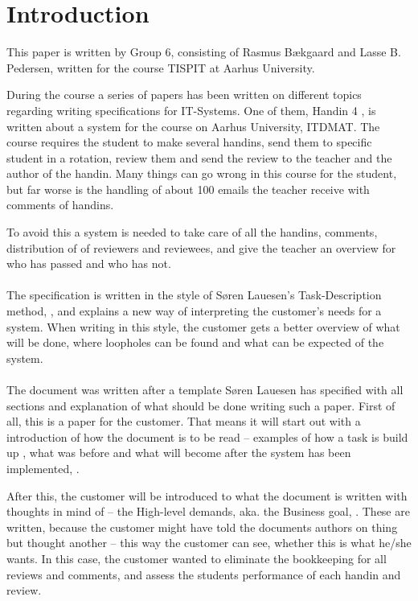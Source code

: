 \documentclass[Main]{subfiles}
\begin{document}
\section{Introduction}


This paper is written by Group 6, consisting of Rasmus Bækgaard and Lasse B. Pedersen, written for the course TISPIT at Aarhus University.


During the course a series of papers has been written on different topics regarding writing specifications for IT-Systems.
One of them, Handin 4 \parencite{HI4}, is written about a system for the course on Aarhus University, ITDMAT. 
The course requires the student to make several handins, send them to specific student in a rotation, review them and send the review to the teacher and the author of the handin.
Many things can go wrong in this course for the student, but far worse is the handling of about 100 emails the teacher receive with comments of handins.

To avoid this a system is needed to take care of all the handins, comments, distribution of of reviewers and reviewees, and give the teacher an overview for who has passed and who has not.
\\
\\
The specification is written in the style of Søren Lauesen's Task-Description method, \parencite{Task}, and explains a new way of interpreting the customer's needs for a system.
When writing in this style, the customer gets a better overview of what will be done, where loopholes can be found and what can be expected of the system.
\\
\\
The document was written after a template Søren Lauesen has specified with all sections and explanation of what should be done writing such a paper.
First of all, this is a paper for the customer.
That means it will start out with a introduction of how the document is to be read -- examples of how a task is build up \parencite[5-6]{HI4}, what was before and what will become after the system has been implemented, \parencite[4]{HI4}.

After this, the customer will be introduced to what the document is written with thoughts in mind of -- the High-level demands, aka. the Business goal, \parencite[7]{HI4}. 
These are written, because the customer might have told the documents authors on thing but thought another -- this way the customer can see, whether this is what he/she wants.
In this case, the customer wanted to eliminate the bookkeeping for all reviews and comments, and assess the students performance of each handin and review.
\end{document}
